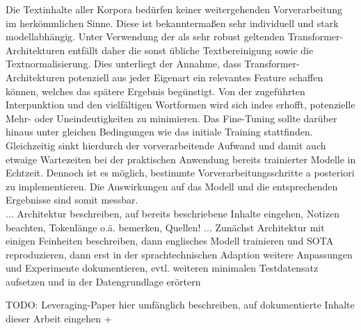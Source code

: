 \noindent
Die Textinhalte aller Korpora bedürfen keiner weitergehenden Vorverarbeitung im herkömmlichen Sinne. Diese ist bekanntermaßen sehr individuell und stark modellabhängig. Unter Verwendung der als sehr robust geltenden Transformer-Architekturen entfällt daher die sonst übliche Textbereinigung sowie die Textnormalisierung. Dies unterliegt der Annahme, dass Transformer-Architekturen potenziell aus jeder Eigenart ein relevantes Feature schaffen können, welches das spätere Ergebnis begünstigt. Von der zugeführten Interpunktion und den vielfältigen Wortformen wird sich indes erhofft, potenzielle Mehr- oder Uneindeutigkeiten zu minimieren. Das Fine-Tuning sollte darüber hinaus unter gleichen Bedingungen wie das initiale Training stattfinden. Gleichzeitig sinkt hierdurch der vorverarbeitende Aufwand und damit auch etwaige Wartezeiten bei der praktischen Anwendung bereits trainierter Modelle in Echtzeit. Dennoch ist es möglich, bestimmte Vorverarbeitungsschritte a posteriori zu implementieren. Die Auswirkungen auf das Modell und die entsprechenden Ergebnisse sind somit messbar.\\

... Architektur beschreiben, auf bereits beschriebene Inhalte eingehen, Notizen beachten, Tokenlänge o.ä. bemerken, Quellen!
... Zunächst Architektur mit einigen Feinheiten beschreiben, dann englisches Modell trainieren und SOTA reproduzieren, dann erst in der sprachtechnischen Adaption weitere Anpassungen und Experimente dokumentieren, evtl. weiteren minimalen Testdatensatz aufsetzen und in der Datengrundlage erörtern

TODO: Leveraging-Paper hier umfänglich beschreiben, auf dokumentierte Inhalte dieser Arbeit eingehen + \cite{VAS17}

